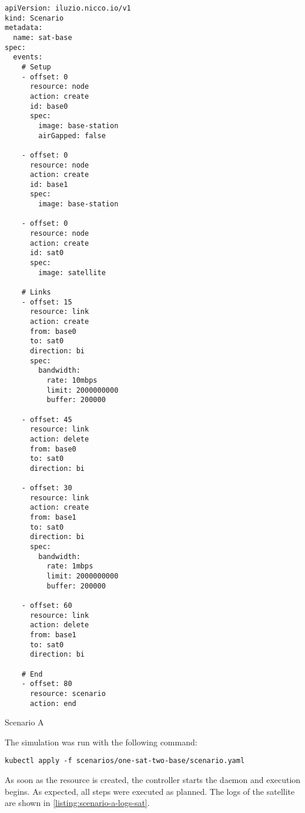 \begin{listing}[H]
  \begin{verbatim}
apiVersion: iluzio.nicco.io/v1
kind: Scenario
metadata:
  name: sat-base
spec:
  events:
    # Setup
    - offset: 0
      resource: node
      action: create
      id: base0
      spec:
        image: base-station
        airGapped: false

    - offset: 0
      resource: node
      action: create
      id: base1
      spec:
        image: base-station

    - offset: 0
      resource: node
      action: create
      id: sat0
      spec:
        image: satellite

    # Links
    - offset: 15
      resource: link
      action: create
      from: base0
      to: sat0
      direction: bi
      spec:
        bandwidth:
          rate: 10mbps
          limit: 2000000000
          buffer: 200000

    - offset: 45
      resource: link
      action: delete
      from: base0
      to: sat0
      direction: bi

    - offset: 30
      resource: link
      action: create
      from: base1
      to: sat0
      direction: bi
      spec:
        bandwidth:
          rate: 1mbps
          limit: 2000000000
          buffer: 200000

    - offset: 60
      resource: link
      action: delete
      from: base1
      to: sat0
      direction: bi

    # End
    - offset: 80
      resource: scenario
      action: end
\end{verbatim}
  \caption{Scenario A}
  \label{listing:scenario-a-scenario}
\end{listing}

The simulation was run with the following command:

\begin{verbatim}
kubectl apply -f scenarios/one-sat-two-base/scenario.yaml
\end{verbatim}

As soon as the resource is created, the controller starts the daemon and execution begins. As expected, all steps were executed as planned. The logs of the satellite are shown in \ref{listing:scenario-a-logs-sat}.

